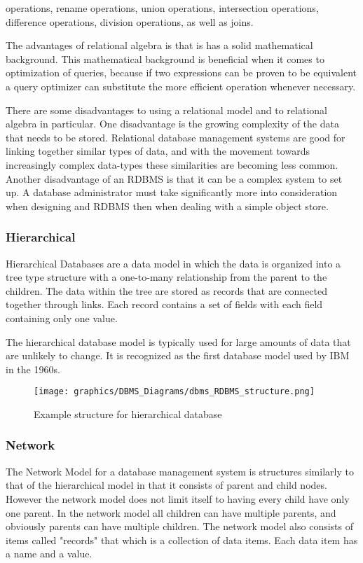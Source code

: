 \documentclass[letterpaper, 12pt]{article}
\begin{document}
operations, rename operations, union operations, intersection operations, difference
operations, division operations, as well as joins. 
\par\vspace{\baselineskip}
The advantages of relational algebra is that is has a solid mathematical background. 
This mathematical background is beneficial when it comes to optimization of queries,
because if two expressions can be proven to be equivalent a query optimizer can 
substitute the more efficient operation whenever necessary.
\par\vspace{\baselineskip}
There are some disadvantages to using a relational model and to relational algebra in
particular. One disadvantage is the growing complexity of the data that needs to be 
stored. Relational database management systems are good for linking together similar types
of data, and with the movement towards increasingly complex data-types these similarities 
are becoming less common. Another disadvantage of an RDBMS is that it can be a complex
system to set up. A database administrator must take significantly more into consideration
when designing and RDBMS then when dealing with a simple object store. 

\subsubsection{Hierarchical}
Hierarchical Databases are a data model in which the data is organized into a tree type 
structure with a one-to-many relationship from the parent to the children. The data 
within the tree are stored as records that are connected together through links. Each
record contains a set of fields with each field containing only one value. 
\par\vspace{\baselineskip}
The hierarchical database model is typically used for large amounts of data that are 
unlikely to change. It is recognized as the first database model used by IBM in 
the 1960s.\cite{hierarchical_dbms_techopedia}
\par\vspace{\baselineskip}
\begin{figure}
  \centering
  \texttt{[image: graphics/DBMS\_Diagrams/dbms\_RDBMS\_structure.png]}
  \caption{Example structure for hierarchical database}
\end{figure}

\subsubsection{Network}
The Network Model for a database management system is structures similarly to that of the
hierarchical model in that it consists of parent and child nodes. However the network 
model does not limit itself to having every child have only one parent. In the network 
model all children can have multiple parents, and obviously parents can have multiple 
children. The network model also consists of items called "records" that which is a 
collection of data items. Each data item has a name and a value. 
\end{document}
